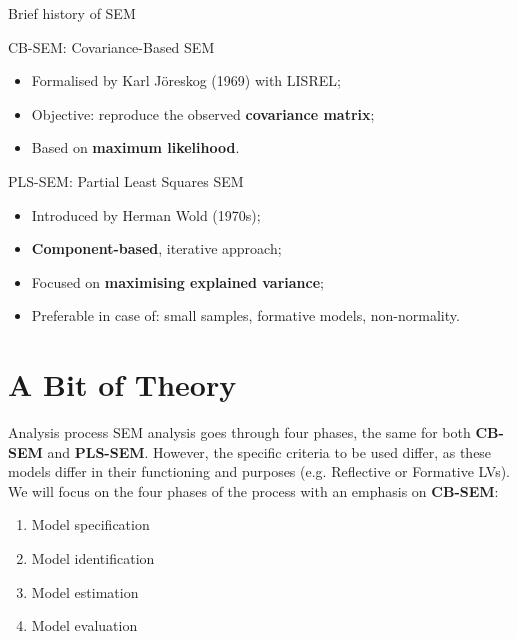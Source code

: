\documentclass{beamer}
\begin{document}
\begin{frame}{Brief history of SEM}
    \begin{block}{CB-SEM: Covariance-Based SEM}
        \begin{itemize}
            \item Formalised by Karl Jöreskog (1969) with LISREL;
            \item Objective: reproduce the observed \textbf{covariance matrix};
            \item Based on \textbf{maximum likelihood}.
        \end{itemize}
    \end{block}
    \begin{block}{PLS-SEM: Partial Least Squares SEM}
        \begin{itemize}
            \item Introduced by Herman Wold (1970s);
            \item \textbf{Component-based}, iterative approach;
            \item Focused on \textbf{maximising explained variance};
            \item Preferable in case of: small samples, formative models, non-normality.
        \end{itemize}
    \end{block}
\end{frame}

\section{A Bit of Theory}
\begin{frame}{Analysis process}
    SEM analysis goes through four phases, the same for both \textbf{CB-SEM} and \textbf{PLS-SEM}. However, the specific criteria to be used differ, as these models differ in their functioning and purposes (e.g. Reflective or Formative LVs). We will focus on the four phases of the process with an emphasis on \textbf{CB-SEM}: \\
    \vspace{1em}
    \begin{enumerate}
        \item Model specification
        \item Model identification
        \item Model estimation
        \item Model evaluation
    \end{enumerate}
\end{frame}
\end{document}
